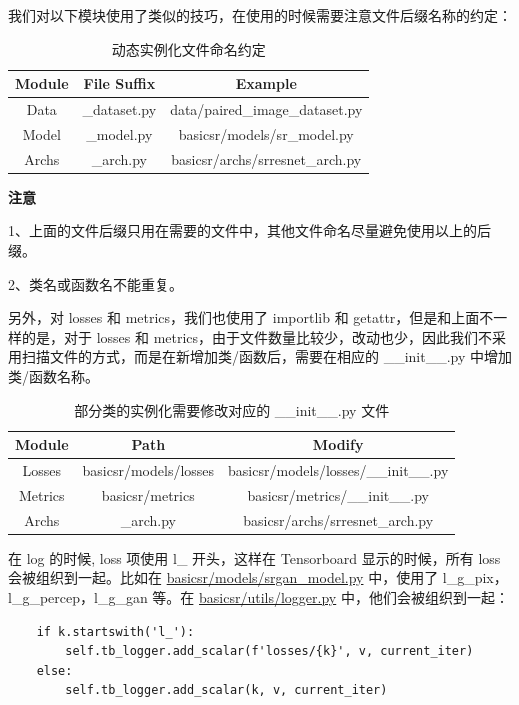 \documentclass[../main.tex]{subfiles}
\begin{document}
    我们对以下模块使用了类似的技巧，在使用的时候需要注意文件后缀名称的约定：
    \begin{table}[h]
    \centering
    \begin{tabular}{|c|c|c|}
    \hline
    \textbf{Module} & \textbf{File Suffix} & \textbf{Example} \\ \hline
    Data & \_dataset.py & data/paired\_image\_dataset.py \\ \hline
    Model & \_model.py & basicsr/models/sr\_model.py \\ \hline
    Archs & \_arch.py & basicsr/archs/srresnet\_arch.py \\ \hline
    \end{tabular}
    \caption{动态实例化文件命名约定}
    \end{table}

    \begin{hl} %
    \textbf{注意}

    1、上面的文件后缀只用在需要的文件中，其他文件命名尽量避免使用以上的后缀。

    2、类名或函数名不能重复。
    \end{hl}

    另外，对 losses 和 metrics，我们也使用了 importlib 和 getattr，但是和上面不一样的是，对于 losses 和 metrics，由于文件数量比较少，改动也少，因此我们不采用扫描文件的方式，而是在新增加类/函数后，需要在相应的 \_\_init\_\_.py 中增加类/函数名称。
    \begin{table}[h]
    \centering
    \begin{tabular}{|c|c|c|}
    \hline
    \textbf{Module} & \textbf{Path} & \textbf{Modify} \\ \hline
    Losses & basicsr/models/losses & basicsr/models/losses/\_\_init\_\_.py \\ \hline
    Metrics & basicsr/metrics & basicsr/metrics/\_\_init\_\_.py \\ \hline
    Archs & \_arch.py & basicsr/archs/srresnet\_arch.py \\ \hline
    \end{tabular}
    \caption{部分类的实例化需要修改对应的 \_\_init\_\_.py 文件}
    \end{table}

    在 log 的时候, loss 项使用 l\_ 开头，这样在 Tensorboard 显示的时候，所有 loss 会被组织到一起。比如在 \href{https://github.com/XPixelGroup/BasicSR/blob/master/basicsr/models/srgan_model.py}{basicsr/models/srgan\_model.py} 中，使用了 l\_g\_pix，l\_g\_percep，l\_g\_gan 等。在 \href{https://github.com/XPixelGroup/BasicSR/blob/master/basicsr/utils/logger.py}{basicsr/utils/logger.py} 中，他们会被组织到一起：
    \begin{verbatim}
    if k.startswith('l_'):
        self.tb_logger.add_scalar(f'losses/{k}', v, current_iter)
    else:
        self.tb_logger.add_scalar(k, v, current_iter)
    \end{verbatim}
\end{document}
